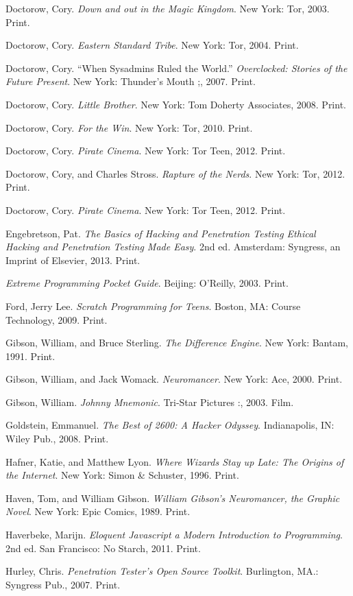 \documentclass[letterpaper,10pt,english]{sphinxmanual}
\begin{document}
Doctorow, Cory. \emph{Down and out in the Magic Kingdom}. New York: Tor, 2003.
Print.

Doctorow, Cory. \emph{Eastern Standard Tribe}. New York: Tor, 2004. Print.

Doctorow, Cory. ``When Sysadmins Ruled the World.'' \emph{Overclocked: Stories of the Future Present}. New York: Thunder's Mouth ;, 2007. Print.

Doctorow, Cory. \emph{Little Brother}. New York: Tom Doherty Associates, 2008.
Print.

Doctorow, Cory. \emph{For the Win}. New York: Tor, 2010. Print.

Doctorow, Cory. \emph{Pirate Cinema}. New York: Tor Teen, 2012. Print.

Doctorow, Cory, and Charles Stross. \emph{Rapture of the Nerds}. New York: Tor,
2012. Print.

Doctorow, Cory. \emph{Pirate Cinema}. New York: Tor Teen, 2012. Print.

Engebretson, Pat. \emph{The Basics of Hacking and Penetration Testing Ethical Hacking and Penetration Testing Made Easy}. 2nd ed. Amsterdam: Syngress,
an Imprint of Elsevier, 2013. Print.

\emph{Extreme Programming Pocket Guide}. Beijing: O'Reilly, 2003. Print.

Ford, Jerry Lee. \emph{Scratch Programming for Teens}. Boston, MA: Course
Technology, 2009. Print.

Gibson, William, and Bruce Sterling. \emph{The Difference Engine}. New York: Bantam, 1991. Print.

Gibson, William, and Jack Womack. \emph{Neuromancer}. New York: Ace, 2000.
Print.

Gibson, William.  \emph{Johnny Mnemonic}. Tri-Star Pictures :, 2003. Film.

Goldstein, Emmanuel. \emph{The Best of 2600: A Hacker Odyssey}. Indianapolis,
IN: Wiley Pub., 2008. Print.

Hafner, Katie, and Matthew Lyon. \emph{Where Wizards Stay up Late: The Origins
of the Internet}. New York: Simon \& Schuster, 1996. Print.

Haven, Tom, and William Gibson. \emph{William Gibson's Neuromancer, the Graphic Novel}. New York: Epic Comics, 1989. Print.

Haverbeke, Marijn. \emph{Eloquent Javascript a Modern Introduction to Programming}. 2nd ed. San Francisco: No Starch, 2011. Print.

Hurley, Chris. \emph{Penetration Tester's Open Source Toolkit}. Burlington,
MA.: Syngress Pub., 2007. Print.
\end{document}
